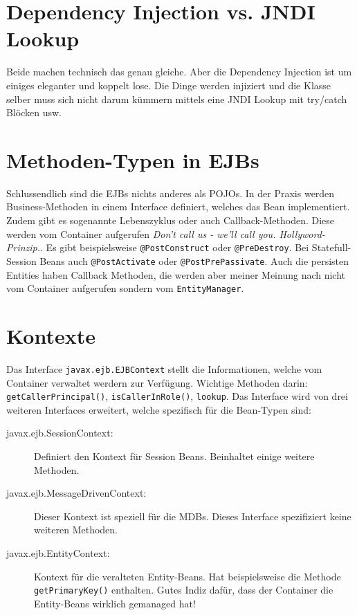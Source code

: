 \section{Dependency Injection vs. JNDI Lookup}
Beide machen technisch das genau gleiche. Aber die Dependency Injection ist um einiges eleganter und koppelt lose. Die Dinge werden injiziert und die Klasse selber muss sich nicht darum kümmern mittels eine JNDI Lookup mit try/catch Blöcken usw.

\section{Methoden-Typen in EJBs}
Schlussendlich sind die EJBs nichts anderes als POJOs. In der Praxis werden Business-Methoden in einem Interface definiert, welches das Bean implementiert. Zudem gibt es sogenannte Lebenszyklus oder auch Callback-Methoden. Diese werden vom Container aufgerufen \emph{Don't call us - we'll call you. Hollyword-Prinzip.}. Es gibt beispielsweise \verb|@PostConstruct| oder \verb|@PreDestroy|. Bei Statefull-Session Beans auch \verb|@PostActivate| oder \verb|@PostPrePassivate|. Auch die persisten Entities haben Callback Methoden, die werden aber meiner Meinung nach nicht vom Container aufgerufen sondern vom \verb|EntityManager|.

\section{Kontexte}
Das Interface \verb|javax.ejb.EJBContext| stellt die Informationen, welche vom Container verwaltet werdern zur Verfügung. Wichtige Methoden darin: \verb|getCallerPrincipal()|, \verb|isCallerInRole()|, \verb|lookup|. Das Interface wird von drei weiteren Interfaces erweitert, welche spezifisch für die Bean-Typen sind:
\begin{description}
	\item[javax.ejb.SessionContext:] Definiert den Kontext für Session Beans. Beinhaltet einige weitere Methoden.
	
	\item[javax.ejb.MessageDrivenContext:] Dieser Kontext ist speziell für die MDBs. Dieses Interface spezifiziert keine weiteren Methoden.
	
	\item[javax.ejb.EntityContext:] Kontext für die veralteten Entity-Beans. Hat beispielsweise die Methode \verb|getPrimaryKey()| enthalten. Gutes Indiz dafür, dass der Container die Entity-Beans wirklich gemanaged hat!
\end{description}

